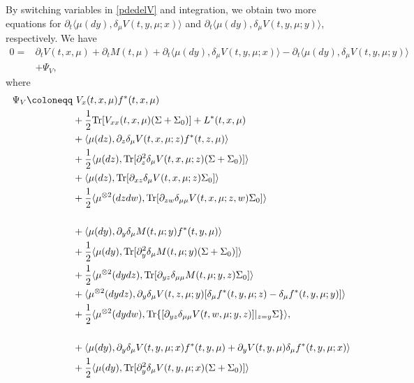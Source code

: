 \documentclass{amsart}
\theoremstyle{definition}
\theoremstyle{remark}
\def\D{\partial}
\numberwithin{equation}{section}
\begin{document}
By switching variables in \eqref{pdedelV} and integration, we  obtain two more  equations for
$ \partial_t \langle\mu(dy), \delta_\mu V(t, y, \mu;x)\rangle$
and $  \partial_t \langle\mu(dy), \delta_\mu V(t, y, \mu;y)\rangle$, respectively.
We have
\begin{align*}
0=&\partial_t V(t, x, \mu)+\partial_t M(t, \mu)
  + \partial_t \langle\mu(dy), \delta_\mu V(t, y, \mu;x)\rangle - \partial_t \langle\mu(dy), \delta_\mu V(t, y, \mu;y)\rangle\\
&+{\Psi}_V,
\end{align*}
where
{\allowdisplaybreaks
\begin{align*}
\Psi_V\coloneqq &
   \  V_x (t, x, \mu)
f^*(t,x,  \mu) \notag \\
&+ \frac{1}{2} {\rm Tr}
[ V_{xx}(t, x, \mu)(\Sigma+ \Sigma_0 ) ] + L^*(t,x,  \mu)\notag \\
& +\langle  \mu(dz), \D_z\delta_\mu V(t,x, \mu; z) f^*(t, z,\mu)\rangle \notag  \\
& +\frac{1}{2}\langle  \mu(dz), {\rm Tr}[
\D_{z}^2 \delta_\mu
V(t, x, \mu; z) (\Sigma+\Sigma_0)]\rangle \notag \\
&+ \langle \mu(dz), {\rm Tr} [ \D_{xz}\delta_\mu V(t,x, \mu;z)  \Sigma_0 ]\rangle \notag  \\
&+\frac{1}{2}\langle\mu^{\otimes2}(dzdw), {\rm Tr}[\D_{zw}\delta_{\mu\mu} V (t, x, \mu; z,w)
\Sigma_0]\rangle \notag\\
& \\
&+\langle  \mu(dy) ,  \partial_y \delta_\mu  M(t, \mu; y) f^*(t, y, \mu)     \rangle \\
& +\frac12 \langle \mu(dy), \mbox{Tr}[ \partial_{y}^2\delta_\mu M (t,\mu;y) (\Sigma+\Sigma_0)]\rangle \nonumber \\
& +\frac12 \langle \mu^{\otimes2}(dydz), \mbox{Tr}[ \partial_{yz}\delta_{\mu\mu} M (t,\mu;y,z) \Sigma_0]\rangle \nonumber \\
& + \langle \mu^{\otimes 2}(dydz),  \partial_{y}\delta_\mu V (t,z,\mu;y) [ \delta_\mu f^*(t,y,\mu;z)- \delta_\mu f^*(t,y,\mu;y) ]\rangle \nonumber \\
&+ \frac12 \langle \mu^{\otimes2}(dydw), \mbox{Tr}\{  [\partial_{yz}\delta_{\mu\mu} V (t,w,\mu;y,z)]|_{z=y} \Sigma\}\rangle,  \nonumber\\
&\\
  &+\langle\mu(dy),  \D_{y} \delta_\mu V (t, y, \mu;x)
f^*(t,y,  \mu) +  \D_{y}  V (t, y, \mu)
\delta_\mu f^*(t,y,  \mu;x)\rangle
 \notag \\
&+ \frac{1}{2} \langle \mu(dy),  {\rm Tr}
[\D_{y}^2\delta_\mu V(t, y, \mu;x)(\Sigma+ \Sigma_0  ) ]\rangle \\

\end{align*}}
\end{document}
